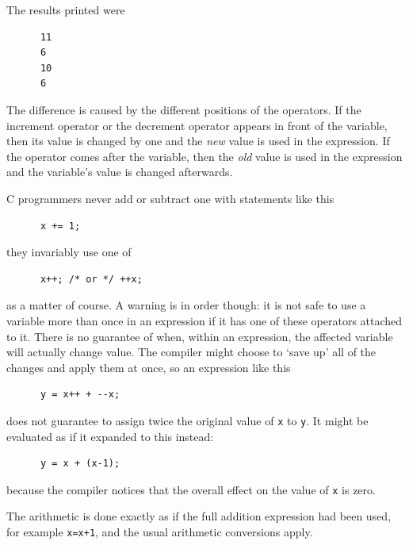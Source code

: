     The results printed were


    \begin{Verbatim}
      11
      6
      10
      6
    \end{Verbatim}

    The difference is caused by the different positions of the operators.
    If the increment operator or the decrement operator
    appears in front of the variable, then its
     value is changed by one and the \textit{new} value is used in the
     expression. If the operator comes after the variable, then the
     \textit{old} value is used in the expression and the variable's value is
     changed afterwards.


    C programmers never add or subtract one with statements like this


    \begin{Verbatim}
      x += 1;
    \end{Verbatim}

    they invariably use one of


    \begin{Verbatim}
      x++; /* or */ ++x;
    \end{Verbatim}

    as a matter of course. A warning is in order though: it is not safe to
     use a variable more than once in an expression if it has one of these
     operators attached to it. There is no guarantee of when, within an
     expression, the affected variable will actually change value. The
     compiler might choose to `save up' all of the changes and apply
     them at once, so an expression like this


    \begin{Verbatim}
      y = x++ + --x;
    \end{Verbatim}

    does not guarantee to assign twice the original value
     of \texttt{x} to \texttt{y}. It might be evaluated as
     if it expanded to this instead:


    \begin{Verbatim}
      y = x + (x-1);
    \end{Verbatim}

    because the compiler notices that the overall effect on the value
     of \texttt{x} is zero.


    The arithmetic is done exactly as if the full addition expression had
     been used, for example \texttt{x=x+1}, and the usual arithmetic
     conversions apply.


